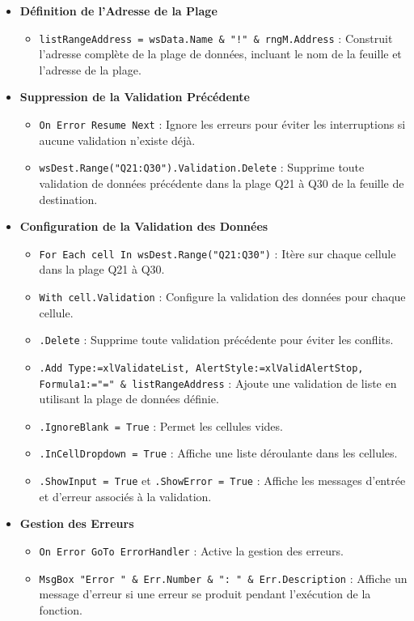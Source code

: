 \documentclass[a4paper, oneside, 12pt, final]{extreport}
\begin{document}
\begin{itemize}
\begin{itemize}
    \end{itemize}
    \item \textbf{Définition de l'Adresse de la Plage}
    \begin{itemize}
        \item \texttt{listRangeAddress = wsData.Name \& "!" \& rngM.Address} : Construit l'adresse complète de la plage de données, incluant le nom de la feuille et l'adresse de la plage.
    \end{itemize}
    \item \textbf{Suppression de la Validation Précédente}
    \begin{itemize}
        \item \texttt{On Error Resume Next} : Ignore les erreurs pour éviter les interruptions si aucune validation n'existe déjà.
        \item \texttt{wsDest.Range("Q21:Q30").Validation.Delete} : Supprime toute validation de données précédente dans la plage Q21 à Q30 de la feuille de destination.
    \end{itemize}
    \item \textbf{Configuration de la Validation des Données}
    \begin{itemize}
        \item \texttt{For Each cell In wsDest.Range("Q21:Q30")} : Itère sur chaque cellule dans la plage Q21 à Q30.
        \item \texttt{With cell.Validation} : Configure la validation des données pour chaque cellule.
        \item \texttt{.Delete} : Supprime toute validation précédente pour éviter les conflits.
        \item \texttt{.Add Type:=xlValidateList, AlertStyle:=xlValidAlertStop, Formula1:="=" \& listRangeAddress} : Ajoute une validation de liste en utilisant la plage de données définie.
        \item \texttt{.IgnoreBlank = True} : Permet les cellules vides.
        \item \texttt{.InCellDropdown = True} : Affiche une liste déroulante dans les cellules.
        \item \texttt{.ShowInput = True} et \texttt{.ShowError = True} : Affiche les messages d'entrée et d'erreur associés à la validation.
    \end{itemize}
    \item \textbf{Gestion des Erreurs}
    \begin{itemize}
        \item \texttt{On Error GoTo ErrorHandler} : Active la gestion des erreurs.
        \item \texttt{MsgBox "Error " \& Err.Number \& ": " \& Err.Description} : Affiche un message d'erreur si une erreur se produit pendant l'exécution de la fonction.
    \end{itemize}
\end{itemize}
\end{document}
